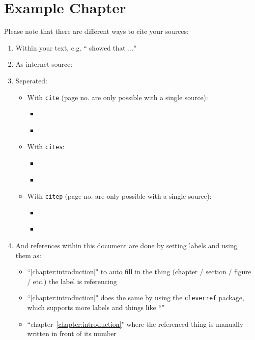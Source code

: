 \chapter{Example Chapter} \label{chapter:example_chapter}

Please note that there are different ways to cite your sources:
\begin{enumerate}
	\item Within your text, e.g. ``\citet[81]{hammer1993reengineering} showed that $\dots$"
	\item As internet source: \citet{diewi}
	\item Seperated: 
		\begin{itemize}
			\item With \texttt{cite} (page no. are only possible with a single source):
				\begin{itemize}
					\item \cite[685]{janiesch2021machine}
					\item \cite{janiesch2021machine, herm2021symbolic}
				\end{itemize}
			\item With \texttt{cites}: 
				\begin{itemize}
					\item \cites[685]{janiesch2021machine}
					\item \cites[685]{janiesch2021machine}[289]{herm2021symbolic}
				\end{itemize}
			\item With \texttt{citep} (page no. are only possible with a single source): 
				\begin{itemize}
					\item \citep[685]{janiesch2021machine}
					\item \citep{janiesch2021machine, herm2021symbolic}
				\end{itemize}
		\end{itemize}
	\item And references within this document are done by setting labels and using them as:
		\begin{itemize}
			\item ``\autoref{chapter:introduction}" to auto fill in the thing (chapter /  section / figure / etc.) the label is referencing
			\item ``\cref{chapter:introduction}" does the same by using the \texttt{cleverref} package, which supports more labels and things like ``"
			\item ``chapter~\ref{chapter:introduction}" where the referenced thing is manually written in front of its number
		\end{itemize}
\end{enumerate}

